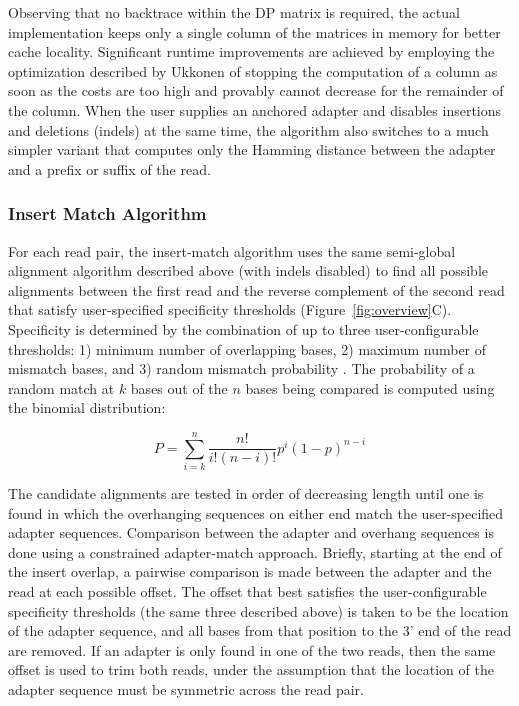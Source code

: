 \documentclass[fleqn,10pt,lineno]{wlpeerj} %
\begin{document}
Observing that no backtrace within the DP matrix is required, the actual implementation keeps only a single column of the matrices in memory for better cache locality. Significant runtime improvements are achieved by employing the optimization described by Ukkonen \citep{Ukkonen1985Finding} of stopping the computation of a column as soon as the costs are too high and provably cannot decrease for the remainder of the column. When the user supplies an anchored adapter and disables insertions and deletions (indels) at the same time, the algorithm also switches to a much simpler variant that computes only the Hamming distance between the adapter and a prefix or suffix of the read.

\subsubsection{Insert Match Algorithm}\label{adapter}

For each read pair, the insert-match algorithm uses the same semi-global alignment algorithm described above (with indels disabled) to find all possible alignments between the first read and the reverse complement of the second read that satisfy user-specified specificity thresholds (Figure~\ref{fig:overview}C). Specificity is determined by the combination of up to three user-configurable thresholds: 1) minimum number of overlapping bases, 2) maximum number of mismatch bases, and 3) random mismatch probability \citep{sturm_seqpurge:_2016}. The probability of a random match at $\mathit{k}$ bases out of the $\mathit{n}$ bases being compared is computed using the binomial distribution:

\begin{equation}
P =\sum_{i=k}^{n} \frac{n!}{i! (n-i)!} p^{i} (1-p)^{n-i}
\label{eq:matchprob}
\end{equation}

The candidate alignments are tested in order of decreasing length until one is found in which the overhanging sequences on either end match the user-specified adapter sequences. Comparison between the adapter and overhang sequences is done using a constrained adapter-match approach. Briefly, starting at the end of the insert overlap, a pairwise comparison is made between the adapter and the read at each possible offset. The offset that best satisfies the user-configurable specificity thresholds (the same three described above) is taken to be the location of the adapter sequence, and all bases from that position to the 3' end of the read are removed. If an adapter is only found in one of the two reads, then the same offset is used to trim both reads, under the assumption that the location of the adapter sequence must be symmetric across the read pair.
\end{document}
